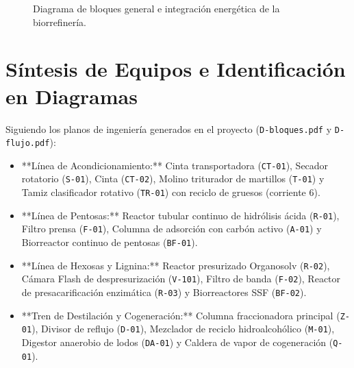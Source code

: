 \documentclass{report}
\begin{document}
\begin{figure}[H]
{%
    }
    \caption{Diagrama de bloques general e integración energética de la biorrefinería.}
    \label{fig:diagrama_bloques_esquema}
\end{figure}

\section{Síntesis de Equipos e Identificación en Diagramas}
Siguiendo los planos de ingeniería generados en el proyecto (\texttt{D-bloques.pdf} y \texttt{D-flujo.pdf}):
\begin{itemize}
    \item **Línea de Acondicionamiento:** Cinta transportadora (\texttt{CT-01}), Secador rotatorio (\texttt{S-01}), Cinta (\texttt{CT-02}), Molino triturador de martillos (\texttt{T-01}) y Tamiz clasificador rotativo (\texttt{TR-01}) con reciclo de gruesos (corriente 6).
    \item **Línea de Pentosas:** Reactor tubular continuo de hidrólisis ácida (\texttt{R-01}), Filtro prensa (\texttt{F-01}), Columna de adsorción con carbón activo (\texttt{A-01}) y Biorreactor continuo de pentosas (\texttt{BF-01}).
    \item **Línea de Hexosas y Lignina:** Reactor presurizado Organosolv (\texttt{R-02}), Cámara Flash de despresurización (\texttt{V-101}), Filtro de banda (\texttt{F-02}), Reactor de presacarificación enzimática (\texttt{R-03}) y Biorreactores SSF (\texttt{BF-02}).
    \item **Tren de Destilación y Cogeneración:** Columna fraccionadora principal (\texttt{Z-01}), Divisor de reflujo (\texttt{D-01}), Mezclador de reciclo hidroalcohólico (\texttt{M-01}), Digestor anaerobio de lodos (\texttt{DA-01}) y Caldera de vapor de cogeneración (\texttt{Q-01}).
\end{itemize}

\printbibliography[heading=bibintoc, title={Referencias Bibliográficas}]
\end{document}

